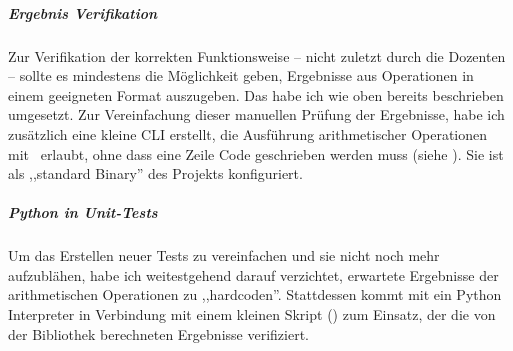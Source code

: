 \subparagraph*{Ergebnis Verifikation}
Zur Verifikation der korrekten Funktionsweise -- nicht zuletzt durch die Dozenten -- sollte es mindestens die Möglichkeit geben, Ergebnisse aus Operationen in einem geeigneten Format auszugeben.
Das habe ich wie oben bereits beschrieben umgesetzt. Zur Vereinfachung dieser manuellen Prüfung der Ergebnisse, habe ich zusätzlich eine kleine CLI erstellt, die Ausführung arithmetischer Operationen mit \mpi\ erlaubt, ohne dass eine Zeile Code geschrieben werden muss (siehe ). Sie ist als ,,standard Binary'' des Projekts konfiguriert.

\subparagraph*{Python in Unit-Tests}
Um das Erstellen neuer Tests zu vereinfachen und sie nicht noch mehr aufzublähen, habe ich weitestgehend darauf verzichtet, erwartete Ergebnisse der arithmetischen Operationen zu ,,hardcoden''. Stattdessen kommt mit  ein Python Interpreter in Verbindung mit einem kleinen Skript () zum Einsatz, der die von der Bibliothek berechneten Ergebnisse verifiziert.
